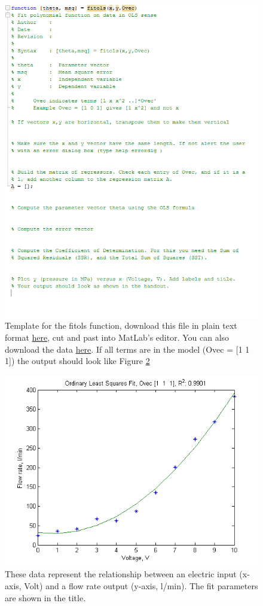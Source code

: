 \documentclass[11pt,letterpaper]{article}
\begin{document}
\begin{figure}
\centering
\includegraphics[width=1\linewidth]{fitols_template}
\caption{Template for the fitols function, download this file in plain text format \href{http://abe-research.illinois.edu/Faculty/grift/ABE425_2015/Labs/fitolsTemplate.txt}{here}, cut and past into MatLab's editor. You can also download the data \href{http://abe-research.illinois.edu/Faculty/grift/ABE425_2015/Labs/OLS_Data.txt}{here}. If all terms are in the model (Ovec = [1 1 1]) the output should look like Figure \ref{fig:Lab6_OLS_DataFitted}}
\label{fig:fitols_template}
\end{figure}

\begin{figure}
\centering
\includegraphics[width=0.8\linewidth]{Lab6_OLS_DataFitted}
\caption{These data represent the relationship between an electric input (x-axis, Volt) and a flow rate output (y-axis, l/min). The fit parameters are shown in the title.}
\label{fig:Lab6_OLS_DataFitted}
\end{figure}
\end{document}
